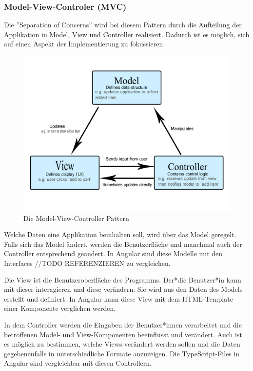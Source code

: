 \cite{MVCmdn}
\cite{MVVM}
\cite{MVC}

\subsubsection{Model-View-Controler (MVC)}
Die ”Separation of Concerns” wird bei diesem Pattern durch die Aufteilung der Applikation in Model, View und Controller realisiert. Dadurch ist es möglich, sich auf einen Aspekt der Implementierung zu fokussieren. 

\begin{figure} [h t]
  \centering
  \includegraphics[scale=0.5]{pics/mvc.png}
  \caption{Die Model-View-Controller Pattern \cite{MVCmdn}}
  \label{fig:tech:front:mvc-architecture}
\end{figure}

Welche Daten eine Applikation beinhalten soll, wird über das Model geregelt. Falls sich das Model ändert, werden die Benutzerfläche und manchmal auch der Controller entsprechend geändert. In Angular sind diese Modelle mit den Interfaces //TODO REFERENZIEREN  zu vergleichen.

Die View ist die Benutzeroberfläche des Programms. Der*die Benutzer*in kann mit dieser interagieren und diese verändern. Sie wird aus den Daten des Models erstellt und definiert. In Angular kann diese View mit dem HTML-Template einer Komponente verglichen werden.

In dem Controller werden die Eingaben der Benutzer*innen verarbeitet und die betroffenen Model- und View-Komponenten beeinflusst und verändert. Auch ist es möglich zu bestimmen, welche Views verändert werden sollen und die Daten gegebenenfalls in unterschiedliche Formate anzuzeigen. Die TypeScript-Files in Angular sind vergleichbar mit diesen Controllern.
\cite{MVC}

